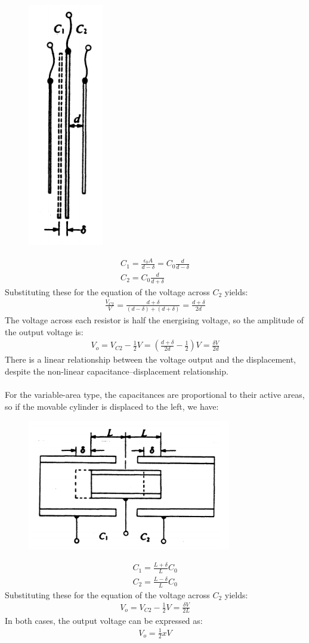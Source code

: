 \documentclass[class=report, crop=false, 12pt,a4paper]{standalone}
\begin{document}
\begin{figure}[H]
  \centering
  \includegraphics[width = 0.15 \textwidth]{../img/Mdiagram6.PNG}
\end{figure}
\begin{gather}
  C_1 = \frac{\epsilon_0A}{d-\delta} = C_0\frac{d}{d-\delta} \\
  C_2 = C_0\frac{d}{d+\delta}
\end{gather}
Substituting these for the equation of the voltage across $C_2$ yields:
\begin{gather}
  \frac{V_{C2}}{V} = \frac{d+\delta}{(d-\delta)+(d+\delta)} = \frac{d+\delta}{2d}
\end{gather}
The voltage across each resistor is half the energising voltage, so the amplitude of the output voltage is:
\begin{gather}
  V_o = V_{C2}-\frac{1}{2}V = \left(\frac{d+\delta}{2d}-\frac{1}{2}\right)V = \frac{\delta V}{2d}
\end{gather}
There is a linear relationship between the voltage output and the displacement, despite the non-linear capacitance–displacement relationship. \\\\
For the variable-area type, the capacitances are proportional to their active areas, so if the movable cylinder is displaced to the left, we have:
\begin{figure}[H]
  \centering
  \includegraphics[width = 0.5 \textwidth]{../img/Mdiagram7.PNG}
\end{figure}
\begin{gather}
  C_1 = \frac{L+\delta}{L}C_0 \\
  C_2 = \frac{L-\delta}{L}C_0
\end{gather}
Substituting these for the equation of the voltage across $C_2$ yields:
\begin{gather}
  V_o = V_{C2}-\frac{1}{2}V = \frac{\delta V}{2L}
\end{gather}
In both cases, the output voltage can be expressed as:
\begin{gather}
  V_o = \frac{1}{2}xV
\end{gather}
\end{document}

